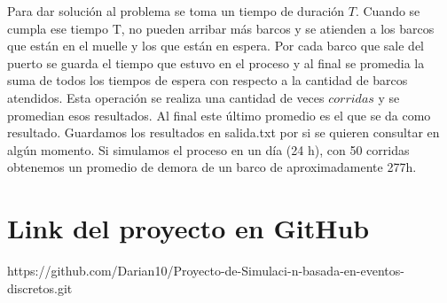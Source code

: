 \documentclass[a4paper,10pt]{article}
\begin{document}
 Para dar solución al problema se toma un tiempo de duración $T$. Cuando se cumpla ese tiempo T, no pueden arribar más barcos y se atienden a los barcos que están en el muelle y los que están en espera. Por cada barco que sale del puerto se guarda el tiempo que estuvo en el proceso y al final se promedia la suma de todos los tiempos de espera con respecto a la cantidad de barcos atendidos. Esta operación se realiza una cantidad de veces $corridas$ y se promedian esos resultados. Al final este último promedio es el que se da como resultado. Guardamos los resultados en salida.txt por si se quieren consultar en algún momento. Si simulamos el proceso en un día (24 h), con 50 corridas obtenemos un promedio de demora de un barco de aproximadamente 277h.

\section*{Link del proyecto en GitHub}
https://github.com/Darian10/Proyecto-de-Simulaci-n-basada-en-eventos-discretos.git
\end{document}
